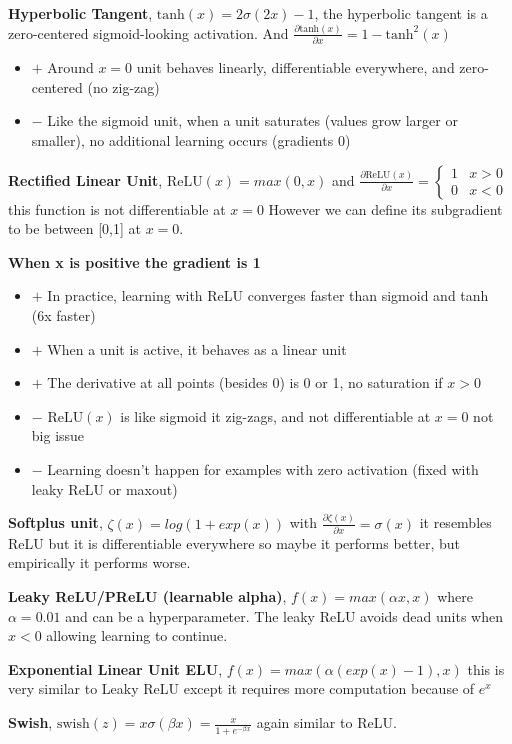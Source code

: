 \documentclass[twocolumn, letter, 10pt, landscape]{article}
\newcommand{\tb}{\textbf}
\newcommand{\bit}{\vspace{-0.1in}\begin{itemize}\setlength\itemsep{-0.05in}}
\newcommand{\eit}{\end{itemize}\vspace{-0.1in}}
\begin{document}
\tb{Hyperbolic Tangent}, $\text{tanh}(x)=2\sigma(2x)-1$, the hyperbolic tangent is a zero-centered sigmoid-looking activation. And $\frac{\partial \text{tanh}(x)}{\partial x} = 1-\text{tanh}^2(x)$

\bit{}
\item[$+$] Around $x=0$ unit behaves linearly, differentiable everywhere, and zero-centered (no zig-zag)
\item[$-$] Like the sigmoid unit, when a unit saturates (values grow larger or smaller), no additional learning occurs (gradients 0)
\eit{}

\tb{Rectified Linear Unit}, $\text{ReLU}(x) = max(0,x)$ and $\frac{\partial\text{ReLU}(x)}{\partial x} = \begin{cases} 1 & x>0\\ 0 & x < 0 \end{cases}$ this function is not differentiable at $x=0$ However we can define its subgradient to be between [0,1] at $x=0$.

\tb{When x is positive the gradient is 1}

\bit{}
\item[$+$] In practice, learning with ReLU converges faster than sigmoid and tanh (6x faster)
\item[$+$] When a unit is active, it behaves as a linear unit
\item[$+$] The derivative at all points (besides 0) is 0 or 1, no saturation if $x>0$
\item[$-$] $\text{ReLU}(x)$ is like sigmoid it zig-zags, and not differentiable at $x=0$ not big issue
\item[$-$] Learning doesn't happen for examples with zero activation (fixed with leaky ReLU or maxout)
\eit{}

\tb{Softplus unit}, $\zeta(x) = log(1+exp(x))$ with $\frac{\partial\zeta(x)}{\partial x} = \sigma(x)$ it resembles ReLU but it is differentiable everywhere so maybe it performs better, but empirically it performs worse.

\tb{Leaky ReLU/PReLU (learnable alpha)}, $f(x) = max(\alpha x, x)$ where $\alpha = 0.01$ and can be a hyperparameter. The leaky ReLU avoids dead units when $x<0$ allowing learning to continue.

\tb{Exponential Linear Unit ELU}, $f(x) = max(\alpha(exp(x)-1),x)$ this is very similar to Leaky ReLU except it requires more computation because of $e^x$

\tb{Swish}, $\text{swish}(z) = x\sigma(\beta x) = \frac{x}{1+e^{-\beta x}}$ again similar to ReLU.
\end{document}
